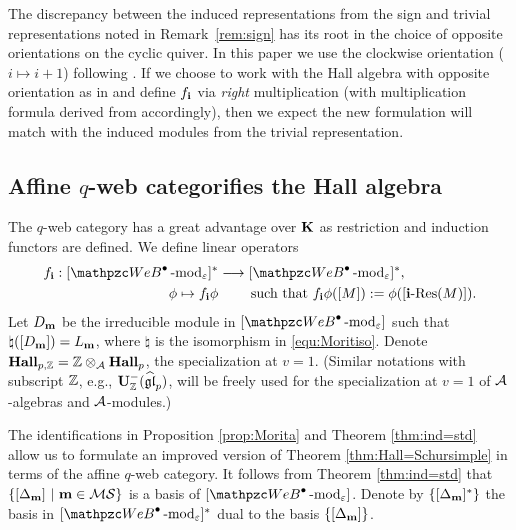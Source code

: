 \begin{rem}
\label{rem:opposite}
The discrepancy between the induced representations from the sign and trivial representations noted in Remark~\ref{rem:sign} has its root in the choice of opposite orientations on the cyclic quiver. In this paper we use the clockwise orientation ($i\mapsto i+1$) following \cite{VV99, DF15}. If we choose to work with the Hall algebra with opposite orientation as in \cite{Ar96, LTV99} and define $f_{\mathbf{i}}$ via  {\em right} multiplication (with multiplication formula derived from \cite{DF15, FL19} accordingly), then we expect the new formulation will match with the induced modules from the trivial representation. 
\end{rem}

\subsection{Affine $q$-web categorifies the Hall algebra}

The $q$-web category has a great advantage over $\bf{K}$ as restriction and induction functors are defined. We define linear operators 
\begin{align}
    \label{euq:defoffi}
    \begin{split}
    f_\bfi: [\qAW \modf_\eps]^* &\longrightarrow [\qAW \modf_\eps]^*, \\
    \phi \mapsto f_\bfi \phi &\qquad \text{ such that }
    f_\bfi \phi ([M]):= \phi ([\bfi\text{-Res}(M)]).
    \end{split}
\end{align}
Let $D_{\mathbf{m}}$ be the irreducible module in $[\qAW \modf_\eps]$ such that  
$\natural ([D_{\mathbf{m}}])= L_{\mathbf{m}}$, where $\natural$ is the isomorphism in \eqref{equ:Moritiso}. Denote $\bold{Hall}_{p,\mathbb{Z}} =\mathbb{Z}\otimes_{\mathcal{A}} \bold{Hall}_{p}$, the specialization at $v=1$. (Similar notations with subscript $\mathbb{Z}$, e.g., $\bold{U}_{\mathbb{Z}}^-(\widehat{\mathfrak{gl}}_p)$, will be freely used for the specialization at $v=1$ of $\mathcal{A}$-algebras and $\mathcal{A}$-modules.) 

The identifications in Proposition \ref{prop:Morita} and Theorem \ref{thm:ind=std} allow us to formulate an improved version of Theorem \ref {thm:Hall=Schursimple} in terms of the affine $q$-web category. It follows from Theorem \ref{thm:ind=std} that  
$\{[\Delta_{\mathbf{m}}]~|~ \mathbf{m}\in \mathcal{M}\mathcal{S}\}$ is a basis of $[\qAW \modf_\eps]$. Denote by $\{[\Delta_{\mathbf{m}}]^*\}$ the basis in $[\qAW \modf_\eps]^*$ dual to the basis $\{[\Delta_{\mathbf{m}}]\}$. 

